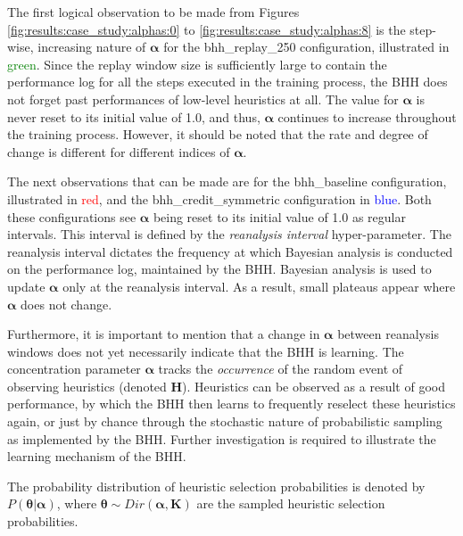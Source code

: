 The first logical observation to be made from Figures \ref{fig:results:case_study:alphas:0} to \ref{fig:results:case_study:alphas:8} is the step-wise, increasing nature of $\boldsymbol{\alpha}$ for the bhh\_replay\_250 configuration, illustrated in \textcolor{green}{green}. Since the replay window size is sufficiently large to contain the performance log for all the steps executed in the training process, the \acs{BHH} does not forget past performances of low-level heuristics at all. The value for $\boldsymbol{\alpha}$ is never reset to its initial value of 1.0, and thus, $\boldsymbol{\alpha}$ continues to increase throughout the training process. However, it should be noted that the rate and degree of change is different for different indices of $\boldsymbol{\alpha}$.

The next observations that can be made are for the bhh\_baseline configuration, illustrated in \textcolor{red}{red}, and the bhh\_credit\_symmetric configuration in \textcolor{blue}{blue}. Both these configurations see $\boldsymbol{\alpha}$ being reset to its initial value of 1.0 as regular intervals. This interval is defined by the \textit{reanalysis interval} hyper-parameter. The reanalysis interval dictates the frequency at which Bayesian analysis is conducted on the performance log, maintained by the \acs{BHH}. Bayesian analysis is used to update $\boldsymbol{\alpha}$ only at the reanalysis interval. As a result, small plateaus appear where $\boldsymbol{\alpha}$ does not change.

Furthermore, it is important to mention that a change in $\boldsymbol{\alpha}$ between reanalysis windows does not yet necessarily indicate that the \acs{BHH} is learning. The concentration parameter $\boldsymbol{\alpha}$ tracks the \textit{occurrence} of the random event of observing heuristics (denoted $\boldsymbol{{H}}$). Heuristics can be observed as a result of good performance, by which the \acs{BHH} then learns to frequently reselect these heuristics again, or just by chance through the stochastic nature of probabilistic sampling as implemented by the \acs{BHH}. Further investigation is required to illustrate the learning mechanism of the \acs{BHH}.


The probability distribution of heuristic selection probabilities is denoted by $P(\boldsymbol{\theta} \vert \boldsymbol{\alpha})$, where $\boldsymbol{\theta} \sim Dir(\boldsymbol{\alpha, K})$ are the sampled heuristic selection probabilities.

